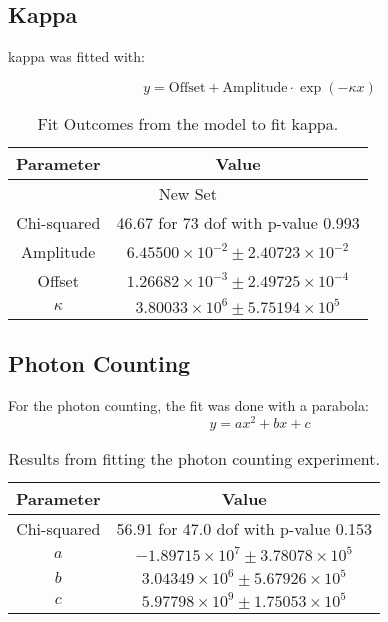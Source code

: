 \subsection{Kappa}
kappa was fitted with:
\begin{fullwidth}
\begin{equation}
    y = \text{Offset} + \text{Amplitude} \cdot \exp \left(- \kappa x\right)
\end{equation}
\end{fullwidth}

\begin{table}[h]
\centering
\begin{tabular}{|c|c|}
\hline
Parameter & Value \\
\hline
\multicolumn{2}{|c|}{New Set} \\
\hline
Chi-squared & 46.67 for 73 dof with p-value 0.993 \\
Amplitude & $6.45500 \times 10^{-2} \pm 2.40723 \times 10^{-2}$ \\
Offset & $1.26682 \times 10^{-3} \pm 2.49725 \times 10^{-4}$ \\
$\kappa$ & $3.80033 \times 10^6 \pm 5.75194 \times 10^5$ \\
\hline
\end{tabular}
\caption{Fit Outcomes from the model to fit kappa.}
\label{tab:fit_outcomes_new}
\end{table}
\FloatBarrier


\subsection{Photon Counting}
For the photon counting, the fit was done with a parabola:
\begin{equation}
    y = ax^2 + bx + c 
\end{equation}
\begin{table}[h]
\centering
\begin{tabular}{|c|c|}
\hline
Parameter & Value \\
\hline
Chi-squared & 56.91 for 47.0 dof with p-value 0.153 \\
$a$ & $-1.89715 \times 10^7 \pm 3.78078 \times 10^5$ \\
$b$ & $3.04349 \times 10^6 \pm 5.67926 \times 10^5$ \\
$c$ & $5.97798 \times 10^9 \pm 1.75053 \times 10^5$ \\
\hline
\end{tabular}
\caption{Results from fitting the photon counting experiment.}
\label{tab:fit_outcomes_seventh}
\end{table}
\FloatBarrier
\newpage

